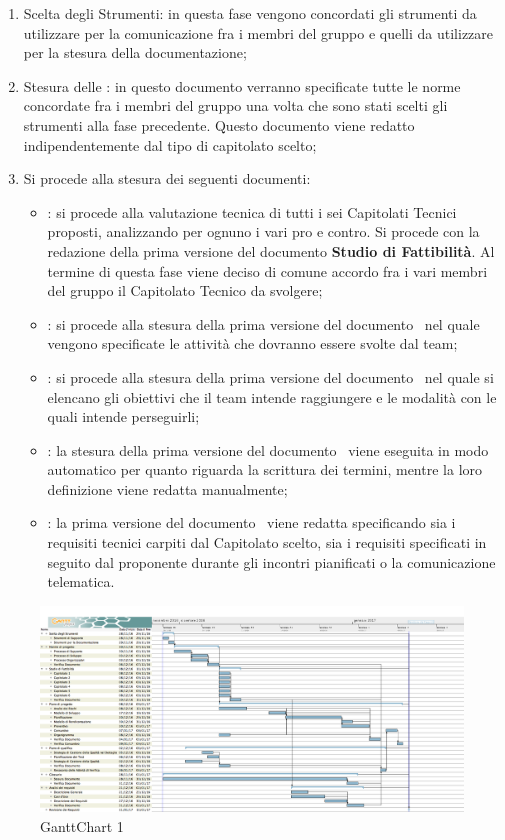 \documentclass[../PianoDiProgetto.tex]{subfiles}
\begin{document}
\begin{enumerate}
	\item Scelta degli Strumenti: in questa fase vengono concordati gli strumenti da utilizzare per la comunicazione  fra i membri del gruppo e quelli da utilizzare per la stesura della documentazione;
	\item Stesura delle \normediprogetto: in questo documento verranno specificate tutte le norme concordate fra i membri del gruppo una volta che sono stati scelti gli strumenti alla fase precedente. Questo documento viene redatto indipendentemente dal tipo di capitolato scelto;
	\item Si procede alla stesura dei seguenti documenti:
		\begin{itemize}
			\item \studiodifattibilita: si procede alla valutazione tecnica di tutti i sei Capitolati Tecnici proposti, analizzando per ognuno i vari pro e contro. Si procede con la redazione della prima versione del documento \textbf{Studio di Fattibilità}. Al termine di questa fase viene deciso di comune accordo fra i vari membri del gruppo il Capitolato Tecnico da svolgere;
			\item \pianodiprogetto: si procede alla stesura della prima versione del documento \textbf{\pianodiprogetto}\ nel quale vengono specificate le attività che dovranno essere svolte dal team;
			\item \pianodiqualifica: si procede alla stesura della prima versione del documento \textbf{\pianodiqualifica}\ nel quale si elencano gli obiettivi che il team intende raggiungere e le modalità con le quali intende perseguirli;
			\item \glossario: la stesura della prima versione del documento \textbf{\glossario}\ viene eseguita in modo automatico per quanto riguarda la scrittura dei termini, mentre la loro definizione viene redatta manualmente;
			\item \analisideirequisiti: la prima versione del documento \textbf{\analisideirequisiti}\ viene redatta specificando sia i requisiti tecnici carpiti dal Capitolato scelto, sia i requisiti specificati in seguito dal proponente durante gli incontri pianificati o la comunicazione telematica.
		\end{itemize}	 
\end{enumerate}

	\begin{figure}[!h]
		\centering
		\includegraphics[width=\textwidth]{Pianificazione/Immagini/GanttChart01.png}
		\caption{GanttChart 1}
	\end{figure}	
\end{document}
